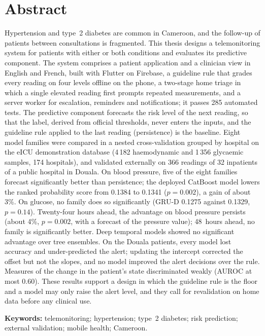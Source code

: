 \documentclass[11pt,a4paper,oneside]{report}
\begin{document}
\chapter*{Abstract}
Hypertension and type~2 diabetes are common in Cameroon, and the follow-up of patients between consultations is fragmented. This thesis designs a telemonitoring system for patients with either or both conditions and evaluates its predictive component. The system comprises a patient application and a clinician view in English and French, built with Flutter on Firebase, a guideline rule that grades every reading on four levels offline on the phone, a two-stage home triage in which a single elevated reading first prompts repeated measurements, and a server worker for escalation, reminders and notifications; it passes 285 automated tests. The predictive component forecasts the risk level of the next reading, so that the label, derived from official thresholds, never enters the inputs, and the guideline rule applied to the last reading (persistence) is the baseline. Eight model families were compared in a nested cross-validation grouped by hospital on the eICU demonstration database (4\,182 haemodynamic and 1\,356 glycaemic samples, 174 hospitals), and validated externally on 366 readings of 32 inpatients of a public hospital in Douala. On blood pressure, five of the eight families forecast significantly better than persistence; the deployed CatBoost model lowers the ranked probability score from 0.1384 to 0.1341 ($p = 0.002$), a gain of about 3\%. On glucose, no family does so significantly (GRU-D 0.1275 against 0.1329, $p = 0.14$). Twenty-four hours ahead, the advantage on blood pressure persists (about 4\%, $p = 0.002$, with a forecast of the pressure value); 48~hours ahead, no family is significantly better. Deep temporal models showed no significant advantage over tree ensembles. On the Douala patients, every model lost accuracy and under-predicted the alert; updating the intercept corrected the offset but not the slopes, and no model improved the alert decisions over the rule. Measures of the change in the patient's state discriminated weakly (AUROC at most 0.60). These results support a design in which the guideline rule is the floor and a model may only raise the alert level, and they call for revalidation on home data before any clinical use.

\medskip
\noindent\textbf{Keywords:} telemonitoring; hypertension; type~2 diabetes; risk prediction; external validation; mobile health; Cameroon.
\end{document}
